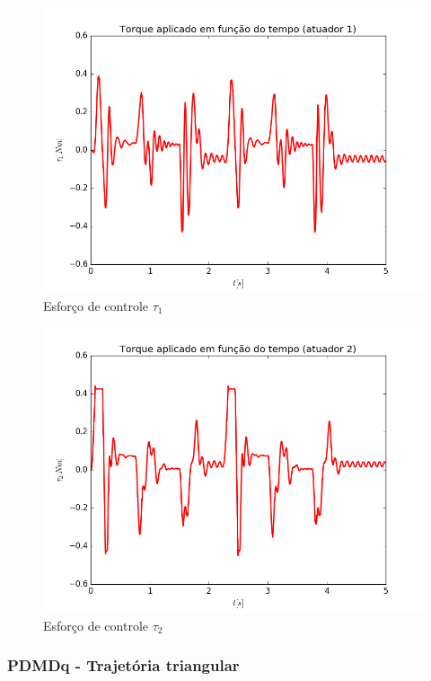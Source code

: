 \documentclass[]{politex}
\begin{document}
\begin{multicols}{2}
\begin{figure}[H]
	\centering
	\includegraphics[scale=0.39]{../../../Experimental/Aquisicoes/PIDt_triangulo/tau1.png}  
	\caption{Esforço de controle $\tau_1$}
	\label{fig:PIDq_triangulo_tau1}
\end{figure}
\begin{figure}[H]
	\centering
	\includegraphics[scale=0.39]{../../../Experimental/Aquisicoes/PIDt_triangulo/tau2.png}  
	\caption{Esforço de controle $\tau_2$}
	\label{fig:PIDq_triangulo_tau2}
\end{figure}
\end{multicols}

\subsubsection{PDMDq - Trajetória triangular}
\end{document}
